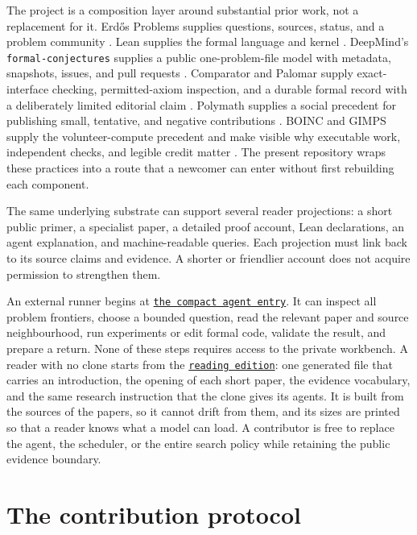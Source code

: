 \documentclass[10pt]{article}
\newcommand{\repobase}{https://github.com/wcook04/plectis-erdos}
\newcommand{\repolink}[2]{\href{\repobase/blob/1d70482583cc9c662cd3b86f66d75c54bb405aa6/#1}{\texttt{#2}}}
\begin{document}
The project is a composition layer around substantial prior work, not a
replacement for it.  Erd\H{o}s Problems supplies questions, sources, status,
and a problem community \cite{erdosproblems}.  Lean supplies the formal
language and kernel \cite{lean4}.  DeepMind's
\texttt{formal-conjectures} supplies a public one-problem-file model with
metadata, snapshots, issues, and pull requests \cite{formalconjectures}.
Comparator and Palomar supply exact-interface checking, permitted-axiom
inspection, and a durable formal record with a deliberately limited editorial
claim \cite{palomar}.  Polymath supplies a social precedent for publishing
small, tentative, and negative contributions \cite{polymath}.  BOINC and GIMPS
supply the volunteer-compute precedent and make visible why executable work,
independent checks, and legible credit matter \cite{boinc,gimps}.  The present
repository wraps these practices into a route that a newcomer can enter
without first rebuilding each component.

The same underlying substrate can support several reader projections: a short
public primer, a specialist paper, a detailed proof account, Lean declarations,
an agent explanation, and machine-readable queries.  Each projection must link
back to its source claims and evidence.  A shorter or friendlier account does
not acquire permission to strengthen them.

An external runner begins at \repolink{AGENTS.md}{the compact agent
entry}.  It can inspect all problem frontiers, choose a bounded question, read
the relevant paper and source neighbourhood, run experiments or edit formal
code, validate the result, and prepare a return.  None of these steps requires
access to the private workbench.  A reader with no clone starts from the
\repolink{docs/reading-edition/README.md}{reading edition}: one generated
file that carries an introduction, the opening of each short paper, the
evidence vocabulary, and the same research instruction that the clone gives
its agents.  It is built from the sources of the papers, so it cannot drift
from them, and its sizes are printed so that a reader knows what a model can
load.  A contributor is free to replace the agent,
the scheduler, or the entire search policy while retaining the public evidence
boundary.

\section{The contribution protocol}\label{sec:protocol}
\end{document}
